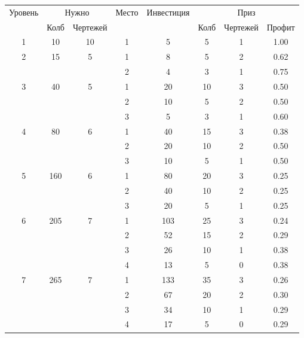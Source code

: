 \begin{longtable}[c]{|c|c|c|c|c|c|c|c|}
    \hline
    \multirow{ 2}{*}{\small Уровень} &
    \multicolumn{2}{|c|}{\small Нужно} &
    \multirow{ 2}{*}{\small Место} & 
    \multirow{ 2}{*}{\small Инвестиция} & 
    \multicolumn{3}{|c|}{\small Приз} \\\cline{2-3}\cline{6-8}
    &
    {\small Колб} & 
    {\small Чертежей} & 
    & &
    {\small Колб} & 
    {\small Чертежей} & 
    {\small Профит}
    \\\hline\endhead
    \multirow{1}{*}{1} & \multirow{1}{*}{10} & \multirow{1}{*}{10} & 1 & 5 & 5 & 1 & 1.00 \\\hline
    \multirow{2}{*}{2} & \multirow{2}{*}{15} & \multirow{2}{*}{5} & 1 & 8 & 5 & 2 & 0.62 \\\cline{4-8}
    & & & 2 & 4 & 3 & 1 & 0.75 \\\hline
    \multirow{3}{*}{3} & \multirow{3}{*}{40} & \multirow{3}{*}{5} & 1 & 20 & 10 & 3 & 0.50 \\\cline{4-8}
    & & & 2 & 10 & 5 & 2 & 0.50 \\\cline{4-8}
    & & & 3 & 5 & 3 & 1 & 0.60 \\\hline
    \multirow{3}{*}{4} & \multirow{3}{*}{80} & \multirow{3}{*}{6} & 1 & 40 & 15 & 3 & 0.38 \\\cline{4-8}
    & & & 2 & 20 & 10 & 2 & 0.50 \\\cline{4-8}
    & & & 3 & 10 & 5 & 1 & 0.50 \\\hline
    \multirow{3}{*}{5} & \multirow{3}{*}{160} & \multirow{3}{*}{6} & 1 & 80 & 20 & 3 & 0.25 \\\cline{4-8}
    & & & 2 & 40 & 10 & 2 & 0.25 \\\cline{4-8}
    & & & 3 & 20 & 5 & 1 & 0.25 \\\hline
    \multirow{4}{*}{6} & \multirow{4}{*}{205} & \multirow{4}{*}{7} & 1 & 103 & 25 & 3 & 0.24 \\\cline{4-8}
    & & & 2 & 52 & 15 & 2 & 0.29 \\\cline{4-8}
    & & & 3 & 26 & 10 & 1 & 0.38 \\\cline{4-8}
    & & & 4 & 13 & 5 & 0 & 0.38 \\\hline
    \multirow{4}{*}{7} & \multirow{4}{*}{265} & \multirow{4}{*}{7} & 1 & 133 & 35 & 3 & 0.26 \\\cline{4-8}
    & & & 2 & 67 & 20 & 2 & 0.30 \\\cline{4-8}
    & & & 3 & 34 & 10 & 1 & 0.29 \\\cline{4-8}
    & & & 4 & 17 & 5 & 0 & 0.29 \\\hline

\end{longtable}
